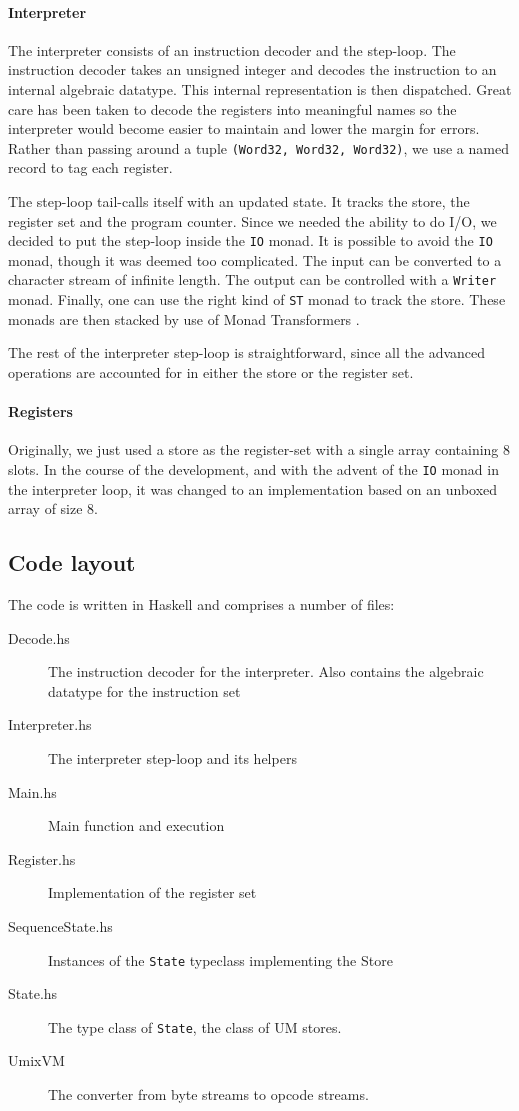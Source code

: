 \paragraph{Interpreter}
\label{sec:interpreter}

The interpreter consists of an instruction decoder and the
step-loop. The instruction decoder takes an unsigned integer and
decodes the instruction to an internal algebraic datatype. This
internal representation is then dispatched. Great care has been taken
to decode the registers into meaningful names so the interpreter would
become easier to maintain and lower the margin for errors. Rather than
passing around a tuple \texttt{(Word32, Word32, Word32)}, we use a
named record to tag each register.

The step-loop tail-calls itself with an updated state. It tracks the
store, the register set and the program counter. Since we needed the
ability to do I/O, we decided to put the step-loop inside the
\texttt{IO} monad. It is possible to avoid the \texttt{IO}
monad, though it was deemed too complicated. The input can be
converted to a character stream of infinite length. The output can be
controlled with a \texttt{Writer} monad. Finally, one can use the
right kind of \texttt{ST} monad to track the store. These monads are
then stacked by use of Monad Transformers \cite{monad+transformer}.

The rest of the interpreter step-loop is straightforward, since all
the advanced operations are accounted for in either the store or the
register set.

\paragraph{Registers}
\label{sec:registers}

Originally, we just used a store as the register-set with a single
array containing 8 slots. In the course of the development, and with
the advent of the \texttt{IO} monad in the interpreter loop, it was
changed to an implementation based on an unboxed array of size 8.

\subsection*{Code layout}

The code is written in Haskell and comprises a number of files:
\begin{description}
\item[Decode.hs] The instruction decoder for the interpreter. Also
  contains the algebraic datatype for the instruction set
\item[Interpreter.hs] The interpreter step-loop and its helpers
\item[Main.hs] Main function and execution
\item[Register.hs] Implementation of the register set
\item[SequenceState.hs] Instances of the \texttt{State} typeclass
  implementing the Store
\item[State.hs] The type class of \texttt{State}, the class of UM stores.
\item[UmixVM] The converter from byte streams to opcode streams.
\end{description}
